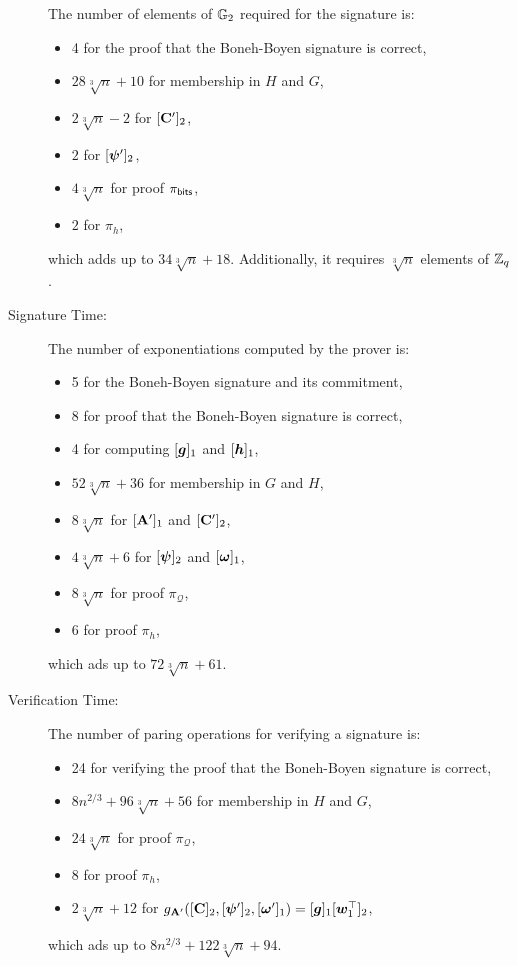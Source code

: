 \begin{description}
The number of elements of $\mathbb{G}_2$ required  for the signature is:
\begin{itemize}
\item 4 for the proof that the Boneh-Boyen signature is correct,
\item $28\sqrt[3]{n} + 10$ for membership in $H$ and $G$,
\item $2\sqrt[3]{n}-2$ for $[\mathbf{{C}}']_2$,
\item $2$ for $[{\boldsymbol{\psi}}']_2$,
\item $4\sqrt[3]{n}$ for proof  $\pi_{\mathsf{bits}}$,
\item $2$ for $\pi_h$,
\end{itemize}
which adds up to $34\sqrt[3]{n} + 18$. Additionally, it requires $\sqrt[3]{n}$ elements of $\mathbb{Z}_q$.
\item[Signature Time:] The number of exponentiations computed by the prover is:
\begin{itemize}
\item 5 for the Boneh-Boyen signature and its commitment,
\item 8 for proof that the Boneh-Boyen signature is correct,
\item 4 for computing $[{\boldsymbol{g}}]_1$ and $[{\boldsymbol{h}}]_1$,
\item $52\sqrt[3]{n}+36$ for membership in $G$ and $H$,
\item $8\sqrt[3]{n}$ for $[\mathbf{{A}}']_1$ and $[\mathbf{{C}}']_2$,
\item $4\sqrt[3]{n}+6$ for $[{\boldsymbol{\psi}}]_2$ and $[{\boldsymbol{\omega}}]_1$, 
\item $8\sqrt[3]{n}$ for proof $\pi_{\mathcal{Q}}$,
\item $6$ for proof $\pi_{h}$,
\end{itemize}
which ads up to $72\sqrt[3]{n}+61$.
\item[Verification Time:] The number of paring operations for verifying a signature is:
\begin{itemize}
\item 24 for verifying the proof that the Boneh-Boyen signature is correct,
\item $8n^{2/3} + 96\sqrt[3]{n} + 56$ for membership in $H$ and $G$,
\item $24\sqrt[3]{n}$ for proof $\pi_{\mathcal{Q}}$,
\item $8$ for proof $\pi_h$,
\item $2\sqrt[3]{n}+12$ for $g_{\mathbf{{A}}'}([\mathbf{{C}}]_2,[{\boldsymbol{\psi}}']_2,[{\boldsymbol{\omega}}']_1)=[{\boldsymbol{g}}]_1[{\boldsymbol{w}}_1^\top]_2$,
\end{itemize}
which ads up to $8n^{2/3} + 122\sqrt[3]{n} + 94$.
\end{description}